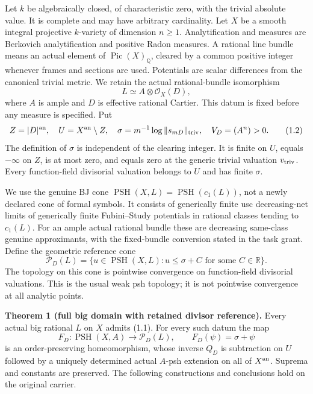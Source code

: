 \documentclass[
  10pt,
]{article}
\begin{document}
Let \(k\) be algebraically closed, of characteristic zero, with the
trivial absolute value. It is complete and may have arbitrary
cardinality. Let \(X\) be a smooth integral projective \(k\)-variety of
dimension \(n\geq1\). Analytification and measures are Berkovich
analytification and positive Radon measures. A rational line bundle
means an actual element of \(\operatorname{Pic}(X)_{\mathbb Q}\),
cleared by a common positive integer whenever frames and sections are
used. Potentials are scalar differences from the canonical trivial
metric. We retain the actual rational-bundle isomorphism \[
             L\simeq A\otimes\mathcal O_X(D),                  \tag{1.1}
\] where \(A\) is ample and \(D\) is effective rational Cartier. This
datum is fixed before any measure is specified. Put \[
 Z=|D|^{\rm an},\quad U=X^{\rm an}\setminus Z,\quad
 \sigma=m^{-1}\log\|s_{mD}\|_{\rm triv},\quad V_D=(A^n)>0.
                                                               \tag{1.2}
\] The definition of \(\sigma\) is independent of the clearing integer.
It is finite on \(U\), equals \(-\infty\) on \(Z\), is at most zero, and
equals zero at the generic trivial valuation \(v_{\rm triv}\). Every
function-field divisorial valuation belongs to \(U\) and has finite
\(\sigma\).

We use the genuine BJ cone
\(\operatorname{PSH}(X,L)=\operatorname{PSH}(c_1(L))\), not a newly
declared cone of formal symbols. It consists of generically finite usc
decreasing-net limits of generically finite Fubini--Study potentials in
rational classes tending to \(c_1(L)\). For an ample actual rational
bundle these are decreasing same-class genuine approximants, with the
fixed-bundle conversion stated in the task grant. Define the geometric
reference cone \[
 \mathcal P_D(L)=\{u\in\operatorname{PSH}(X,L):u\leq\sigma+C
                                      \text{ for some }C\in\mathbb R\}. \tag{1.3}
\] The topology on this cone is pointwise convergence on function-field
divisorial valuations. This is the usual weak psh topology; it is not
pointwise convergence at all analytic points.

\textbf{Theorem 1 (full big domain with retained divisor reference).}
Every actual big rational \(L\) on \(X\) admits (1.1). For every such
datum the map \[
 F_D:\operatorname{PSH}(X,A)\longrightarrow\mathcal P_D(L),
                 \qquad F_D(\psi)=\sigma+\psi                  \tag{1.4}
\] is an order-preserving homeomorphism, whose inverse \(Q_D\) is
subtraction on \(U\) followed by a uniquely determined actual \(A\)-psh
extension on all of \(X^{\rm an}\). Suprema and constants are preserved.
The following constructions and conclusions hold on the original
carrier.
\end{document}
